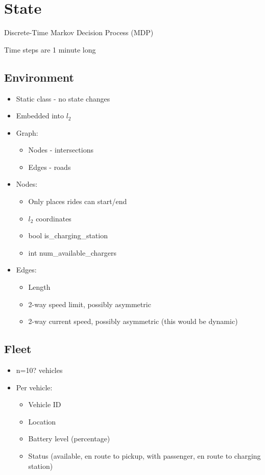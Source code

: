 \documentclass[12pt]{article}
\begin{document}
\psetheader %

\section*{State}
Discrete-Time Markov Decision Process (MDP)

Time steps are 1 minute long

\subsection*{Environment}
\begin{itemize}
		\item Static class - no state changes
		\item Embedded into $l_2$
		\item Graph:
				\begin{itemize}
						\item Nodes - intersections
						\item Edges - roads
				\end{itemize}
		\item Nodes:
				\begin{itemize}
						\item Only places rides can start/end
						\item $l_2$ coordinates
						\item bool is\_charging\_station
						\item int num\_available\_chargers
				\end{itemize}
		\item Edges:
				\begin{itemize}
						\item Length
						\item 2-way speed limit, possibly asymmetric
						\item {} 2-way current speed, possibly asymmetric (this would be dynamic)
				\end{itemize}
\end{itemize}
\subsection*{Fleet}
\begin{itemize}
		\item n=10? vehicles
		\item Per vehicle:
    \begin{itemize}
						\item Vehicle ID
						\item Location
						\item Battery level (percentage)
						\item Status (available, en route to pickup, with passenger, en route to charging station)
    \end{itemize}
\end{itemize}
\end{document}
